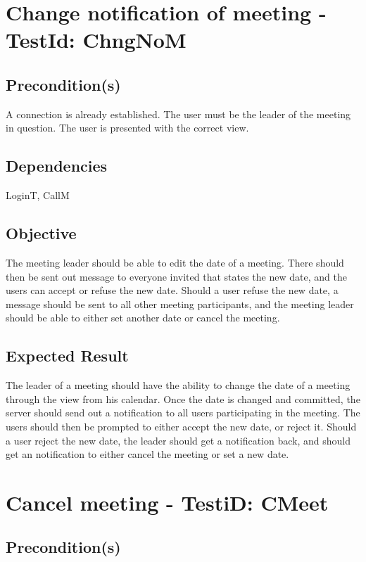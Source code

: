 \documentclass{article}
\begin{document}
\section{Change notification of meeting - TestId: ChngNoM}

\subsection{Precondition(s)}

A connection is already established. The user must be the leader of the
meeting in question. The user is presented with the correct view.

\subsection{Dependencies}

LoginT, CallM

\subsection{Objective}

The meeting leader should be able to edit the date of a meeting. There
should then be sent out message to everyone invited that states the new
date, and the users can accept or refuse the new date. Should a user refuse
the new date, a message should be sent to all other meeting participants,
and the meeting leader should be able to either set another date or cancel
the meeting.

\subsection{Expected Result}

The leader of a meeting should have the ability to change the date of a
meeting through the view from his calendar. Once the date is changed and
committed, the server should send out a notification to all users
participating in the meeting. The users should then be prompted to either
accept the new date, or reject it. Should a user reject the new date, the
leader should get a notification back, and should get an notification to
either cancel the meeting or set a new date. \newpage

\section{Cancel meeting - TestiD: CMeet}

\subsection{Precondition(s)}
\end{document}
